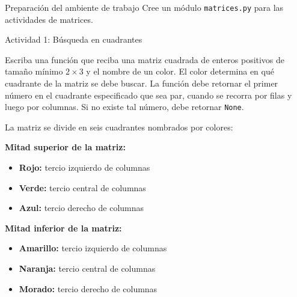 \documentclass{ip-lab}
\begin{document}
\maketitle

\begin{sectionbox}{Preparación del ambiente de trabajo}
Cree un módulo \texttt{matrices.py} para las actividades de matrices.
\end{sectionbox}

\begin{sectionbox}{Actividad 1: Búsqueda en cuadrantes}

Escriba una función que reciba una matriz cuadrada de enteros positivos de tamaño mínimo $2\times 3$ y el nombre de un color. El color determina en qué cuadrante de la matriz se debe buscar. La función debe retornar el primer número en el cuadrante especificado que sea par, cuando se recorra por filas y luego por columnas. Si no existe tal número, debe retornar \texttt{None}.

La matriz se divide en seis cuadrantes nombrados por colores:

\textbf{Mitad superior de la matriz:}
\begin{itemize}
    \item \textbf{Rojo:} tercio izquierdo de columnas
    \item \textbf{Verde:} tercio central de columnas
    \item \textbf{Azul:} tercio derecho de columnas
\end{itemize}

\textbf{Mitad inferior de la matriz:}
\begin{itemize}
    \item \textbf{Amarillo:} tercio izquierdo de columnas
    \item \textbf{Naranja:} tercio central de columnas
    \item \textbf{Morado:} tercio derecho de columnas
\end{itemize}

\begin{center}
\end{center}
\end{sectionbox}
\end{document}
